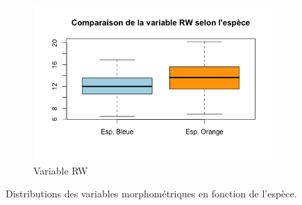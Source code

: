 \documentclass[a4paper,10pt]{report}
\begin{document}
\begin{figure}[H]
\begin{subfigure}[b]{0.3\linewidth}
		\includegraphics[width=1\linewidth]{img/1-2-1-espece-rw.png}
		\caption{\scriptsize Variable RW}
		\label{fig:1_2_1_espece_rw}
	\end{subfigure}%
	\caption{
		\small Distributions des variables morphométriques en fonction de l'espèce.
	}
	\label{fig:morphemetriques_en_fonction_espece}%
\end{figure}%
\end{document}
